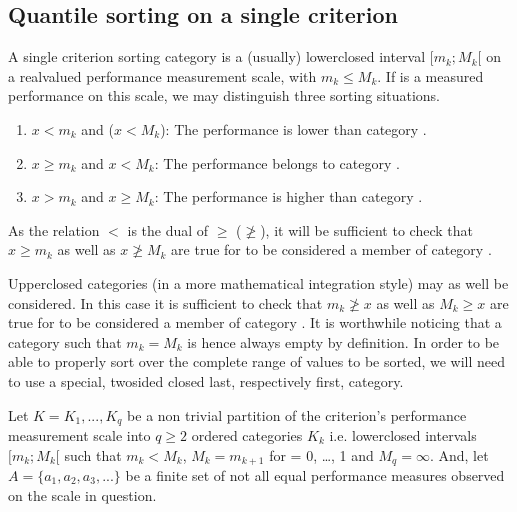 \documentclass[a4paper,12pt,english]{sphinxhowto}
\begin{document}
\subsection{Quantile sorting on a single criterion}
\label{\detokenize{tutorial:quantile-sorting-on-a-single-criterion}}
A single criterion sorting category  is a (usually) lower\sphinxhyphen{}closed interval \([m_k ; M_k[\) on a real\sphinxhyphen{}valued performance measurement scale, with \(m_k \leq M_k\). If  is a measured performance on this scale, we may distinguish three sorting situations.
\begin{enumerate}
%
\item {} 
\(x < m_k\) and (\(x < M_k\)): The performance  is lower than category .

\item {} 
\(x \geqslant m_k\) and \(x < M_k\): The performance  belongs to category .

\item {} 
\(x > m_k\) and \(x \geqslant M_k\): The performance  is higher than category .

\end{enumerate}

As the relation \(<\) is the dual of \(\geqslant\) (\(\not\geqslant\)), it will be sufficient to check that \(x \geqslant m_k\) as well as \(x \not\geqslant M_k\) are true for  to be considered a member of category .

Upper\sphinxhyphen{}closed categories (in a more mathematical integration style) may as well be considered. In this case it is sufficient to check that \(m_k \not\geqslant x\) as well as \(M_k \geq x\) are true for  to be considered a member of category . It is worthwhile noticing that a category  such that \(m_k = M_k\) is hence always empty by definition. In order to be able to properly sort over the complete range of values to be sorted, we will need to use a special, two\sphinxhyphen{}sided closed last, respectively first, category.

Let \(K = {K_1 , ..., K_q}\) be a non trivial partition of the criterion’s performance measurement scale into \(q \geq 2\) ordered categories \(K_k\) \textendash{} i.e. lower\sphinxhyphen{}closed intervals \([m_k ; M_k[\) \textendash{} such that \(m_k < M_k\), \(M_k = m_{k+1}\) for  = 0, …,  \sphinxhyphen{} 1 and \(M_q = \infty\). And, let \(A=\{a_1 , a_2 , a_3 , ...\}\) be a finite set of not all equal performance measures observed on the scale in question.
\end{document}
